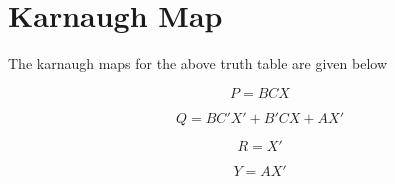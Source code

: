 \documentclass{article}
\begin{document}
\newpage
\section{Karnaugh Map}
  The karnaugh maps for the above truth table are given below

 \vspace{5mm}

\begin{karnaugh-map}[4][4][1][$CX$][$AB$]
	\autoterms[$X$]

    \end{karnaugh-map}
    \newline                                         
    \begin{equation}                                   P=BCX      
    \label{eq1}                
    \end{equation}

    \begin{karnaugh-map}[4][4][1][$CX$][$AB$]  
	     \autoterms[$X$]
	    
	    \end{karnaugh-map}   
	    \newline  
	    \begin{equation}   
	    Q = BC'X'+B'CX+AX'     
	      \label{eq2}   
	    \end{equation}

	\begin{karnaugh-map}[4][4][1][$CX$][$AB$]
	\autoterms[$X$]
		\end{karnaugh-map}    
		\newline       
		\begin{equation}    
		R = X'   
		\label{eq3}    
		\end{equation}  

	\begin{karnaugh-map}[4][4][1][$CX$][$AB$]
		\autoterms[$X$]
		\end{karnaugh-map} 
		\newline         
		\begin{equation}  
		Y = AX'
		\label{eq4}     
		\end{equation}
\newpage
\end{document}
